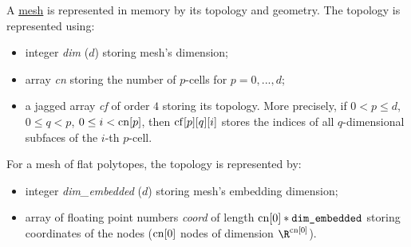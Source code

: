 \begin{definition}
  A \hyperref[cmc:mesh:definition]{mesh}
  is represented in memory by its topology and geometry.
  The topology is represented using:
  \begin{itemize}
    \item
      integer \emph{dim} ($d$) storing mesh's dimension;
    \item
      array \emph{cn} storing the number of $p$-cells for $p = 0, ..., d$;
    \item
      a jagged array \emph{cf} of order $4$ storing its topology.
      More precisely, if $0 < p \leq d$, $0 \leq q < p$,
      $0 \leq i < {\rm cn}[p]$, then ${\rm cf}[p][q][i]$ stores the indices of
      all $q$-dimensional subfaces of the $i$-th $p$-cell.
  \end{itemize}
  For a mesh of flat polytopes, the topology is represented by:
  \begin{itemize}
    \item
      integer \emph{dim\_embedded} ($d$) storing mesh's embedding dimension;
    \item
      array of floating point numbers \emph{coord} of length
      ${\rm cn}[0] * \verb|dim_embedded|$ storing coordinates of the nodes
      (${\rm cn}[0]$ nodes of dimension $\R^{{\rm cn}[0]}$).
  \end{itemize}
\end{definition}
